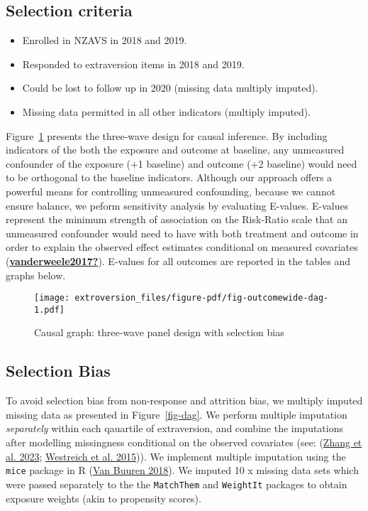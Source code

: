 \documentclass[
  singlecolumn]{report}
\providecommand{\tightlist}{%
  \setlength{\itemsep}{0pt}\setlength{\parskip}{0pt}}\usepackage{longtable,booktabs,array}
\begin{document}
\hypertarget{selection-criteria}{%
\subsection{Selection criteria}\label{selection-criteria}}

\begin{itemize}
\tightlist
\item
  Enrolled in NZAVS in 2018 and 2019.
\item
  Responded to extraversion items in 2018 and 2019.
\item
  Could be lost to follow up in 2020 (missing data multiply imputed).
\item
  Missing data permitted in all other indicators (multiply imputed).
\end{itemize}

Figure~\ref{fig-outcomewide-dag} presents the three-wave design for
causal inference. By including indicators of the both the exposure and
outcome at baseline, any unmeasured confounder of the exposure (+1
baseline) and outcome (+2 baseline) would need to be orthogonal to the
baseline indicators. Although our approach offers a powerful means for
controlling unmeasured confounding, because we cannot ensure balance, we
peform sensitivity analysis by evaluating E-values. E-values represent
the minimum strength of association on the Risk-Ratio scale that an
unmeasured confounder would need to have with both treatment and outcome
in order to explain the observed effect estimates conditional on
measured covariates
(\protect\hyperlink{ref-vanderweele2017}{\textbf{vanderweele2017?}}).
E-values for all outcomes are reported in the tables and graphs below.

\begin{figure}

{\centering \texttt{[image: extroversion\_files/figure-pdf/fig-outcomewide-dag-1.pdf]}

}

\caption{\label{fig-outcomewide-dag}Causal graph: three-wave panel
design with selection bias}

\end{figure}

\hypertarget{selection-bias}{%
\subsection{Selection Bias}\label{selection-bias}}

To avoid selection bias from non-response and attrition bias, we
multiply imputed missing data as presented in Figure~\ref{fig-dag}. We
perform multiple imputation \emph{separately} within each qauartile of
extraversion, and combine the imputations after modelling missingness
conditional on the observed covariates (see:
(\protect\hyperlink{ref-zhang2023}{Zhang et al. 2023};
\protect\hyperlink{ref-westreich2015}{Westreich et al. 2015})). We
implement multiple imputation using the \texttt{mice} package in R
(\protect\hyperlink{ref-vanbuuren2018}{Van Buuren 2018}). We imputed 10
x missing data sets which were passed separately to the the
\texttt{MatchThem} and \texttt{WeightIt} packages to obtain exposure
weights (akin to propensity scores).
\end{document}
